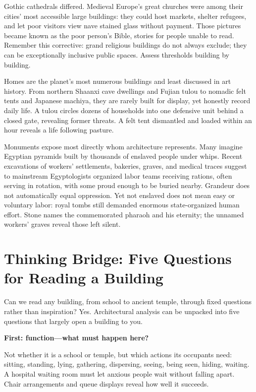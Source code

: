 Gothic cathedrals differed. Medieval Europe's great churches were among their cities' most accessible large buildings: they could host markets, shelter refugees, and let poor visitors view nave stained glass without payment. Those pictures became known as the poor person's Bible, stories for people unable to read. Remember this corrective: grand religious buildings do not always exclude; they can be exceptionally inclusive public spaces. Assess thresholds building by building.

Homes are the planet's most numerous buildings and least discussed in art history. From northern Shaanxi cave dwellings and Fujian tulou to nomadic felt tents and Japanese machiya, they are rarely built for display, yet honestly record daily life. A tulou circles dozens of households into one defensive unit behind a closed gate, revealing former threats. A felt tent dismantled and loaded within an hour reveals a life following pasture.

Monuments expose most directly whom architecture represents. Many imagine Egyptian pyramids built by thousands of enslaved people under whips. Recent excavations of workers' settlements, bakeries, graves, and medical traces suggest to mainstream Egyptologists organized labor teams receiving rations, often serving in rotation, with some proud enough to be buried nearby. Grandeur does not automatically equal oppression. Yet not enslaved does not mean easy or voluntary labor: royal tombs still demanded enormous state-organized human effort. Stone names the commemorated pharaoh and his eternity; the unnamed workers' graves reveal those left silent.

\section[Five Questions for Reading Buildings]{Thinking Bridge: Five Questions for Reading a Building}
Can we read any building, from school to ancient temple, through fixed questions rather than inspiration? Yes. Architectural analysis can be unpacked into five questions that largely open a building to you.

\textbf{First: function---what must happen here?}

Not whether it is a school or temple, but which actions its occupants need: sitting, standing, lying, gathering, dispersing, seeing, being seen, hiding, waiting. A hospital waiting room must let anxious people wait without falling apart. Chair arrangements and queue displays reveal how well it succeeds.

